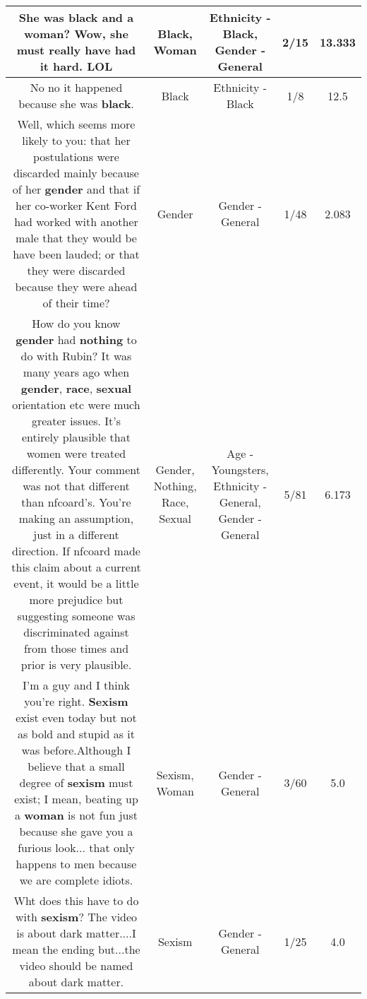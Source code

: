 \documentclass[11pt]{article}
\newlength\mylength
\begin{document}
\begin{center}
\begin{longtable}{|C{.65\mylength}|C{.30\mylength}|C{.12\mylength}|C{.12\mylength}|C{.12\mylength}|}
  \small She was \textbf{black} and a \textbf{woman}? Wow, she must really have had it hard. LOL\normalsize   & Black, Woman & Ethnicity - Black, Gender - General & 2/15 & 13.333 \\  \hline
  \small No no it happened because she was \textbf{black}.\normalsize   & Black & Ethnicity - Black & 1/8 & 12.5 \\  \hline
  \small Well, which seems more likely to you: that her postulations were discarded mainly because of her \textbf{gender} and that if her co-worker Kent Ford had worked with another male that they would be have been lauded; or that they were discarded because they were ahead of their time?\normalsize   & Gender & Gender - General & 1/48 & 2.083 \\  \hline
  \small How do you know \textbf{gender} had \textbf{nothing} to do with Rubin? It was many years ago when \textbf{gender}, \textbf{race}, \textbf{sexual} orientation etc were much greater issues. It's entirely plausible that women were treated differently. Your comment was not that different than nfcoard's. You're making an assumption, just in a different direction. If nfcoard made this claim about a current event, it would be a little more prejudice but suggesting someone was discriminated against from those times and prior is very plausible.\normalsize   & Gender, Nothing, Race, Sexual & Age - Youngsters, Ethnicity - General, Gender - General & 5/81 & 6.173 \\  \hline
  \small I'm a guy and I think you're right. \textbf{Sexism} exist even today but not as bold and stupid as it was before.Although I believe that a small degree of \textbf{sexism} must exist; I mean, beating up a \textbf{woman} is not fun just because she gave you a furious look... that only happens to men because we are complete idiots.\normalsize   & Sexism, Woman & Gender - General & 3/60 & 5.0 \\  \hline
  \small Wht does this have to do with \textbf{sexism}? The video is about dark matter....I mean the ending but...the video should be named about dark matter.\normalsize   & Sexism & Gender - General & 1/25 & 4.0 \\  \hline

\end{longtable}
\end{center}
\end{document}

